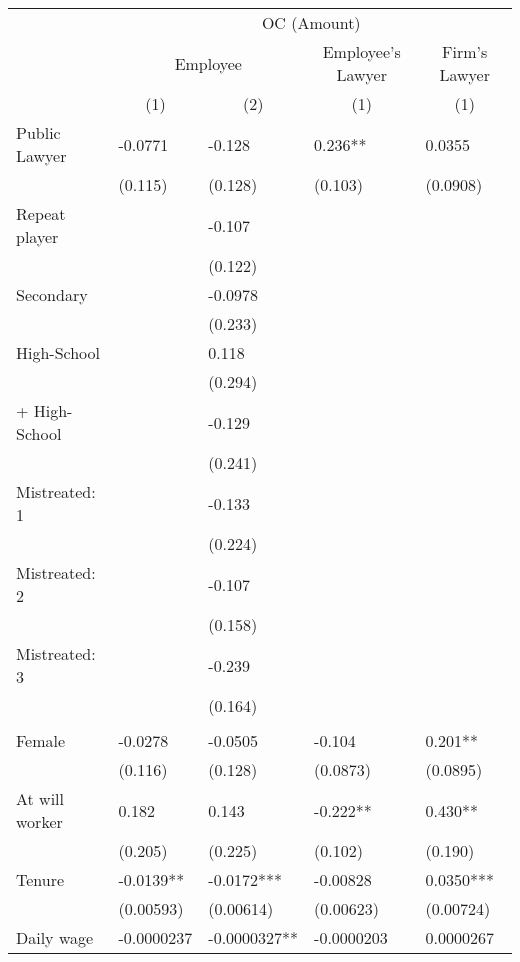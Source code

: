 \begin{tabular}{lllll}
      & \multicolumn{4}{c}{OC (Amount)} \\
\cmidrule{2-5}      & \multicolumn{2}{c}{Employee} & \multicolumn{1}{c}{Employee's Lawyer} & \multicolumn{1}{c}{Firm's  Lawyer} \\
\cmidrule{2-5}      & \multicolumn{1}{c}{(1)} & \multicolumn{1}{c}{(2)} & \multicolumn{1}{c}{(1)} & \multicolumn{1}{c}{(1)} \\
\cmidrule{2-5}Public Lawyer & -0.0771 & -0.128 & 0.236** & 0.0355 \\
      & (0.115) & (0.128) & (0.103) & (0.0908) \\
Repeat player &       & -0.107 &       &  \\
      &       & (0.122) &       &  \\
Secondary &       & -0.0978 &       &  \\
      &       & (0.233) &       &  \\
High-School &       & 0.118 &       &  \\
      &       & (0.294) &       &  \\
+ High-School &       & -0.129 &       &  \\
      &       & (0.241) &       &  \\
Mistreated: 1 &       & -0.133 &       &  \\
      &       & (0.224) &       &  \\
Mistreated: 2 &       & -0.107 &       &  \\
      &       & (0.158) &       &  \\
Mistreated: 3 &       & -0.239 &       &  \\
      &       & (0.164) &       &  \\
      &       &       &       &  \\
Female & -0.0278 & -0.0505 & -0.104 & 0.201** \\
      & (0.116) & (0.128) & (0.0873) & (0.0895) \\
At will worker & 0.182 & 0.143 & -0.222** & 0.430** \\
      & (0.205) & (0.225) & (0.102) & (0.190) \\
Tenure & -0.0139** & -0.0172*** & -0.00828 & 0.0350*** \\
      & (0.00593) & (0.00614) & (0.00623) & (0.00724) \\
Daily wage & -0.0000237 & -0.0000327** & -0.0000203 & 0.0000267 \\

\end{tabular}
